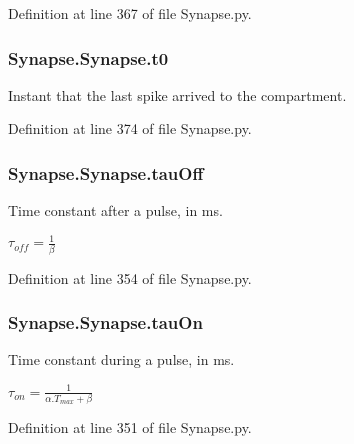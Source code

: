Definition at line 367 of file Synapse.\+py.

\subsubsection[{\texorpdfstring{t0}{t0}}]{\setlength{\rightskip}{0pt plus 5cm}Synapse.\+Synapse.\+t0}\hypertarget{class_synapse_1_1_synapse_ad0adf1cb832bd7ce7918f2779171d7d7}{}\label{class_synapse_1_1_synapse_ad0adf1cb832bd7ce7918f2779171d7d7}


Instant that the last spike arrived to the compartment. 



Definition at line 374 of file Synapse.\+py.

\subsubsection[{\texorpdfstring{tau\+Off}{tauOff}}]{\setlength{\rightskip}{0pt plus 5cm}Synapse.\+Synapse.\+tau\+Off}\hypertarget{class_synapse_1_1_synapse_afd5638a223c3fdcc672002dbced7bed0}{}\label{class_synapse_1_1_synapse_afd5638a223c3fdcc672002dbced7bed0}


Time constant after a pulse, in ms. 

$\tau_{off}=\frac{1}{\beta}$ 

Definition at line 354 of file Synapse.\+py.

\subsubsection[{\texorpdfstring{tau\+On}{tauOn}}]{\setlength{\rightskip}{0pt plus 5cm}Synapse.\+Synapse.\+tau\+On}\hypertarget{class_synapse_1_1_synapse_aae46f8edd1e94ea2ab51e3612afd3a3f}{}\label{class_synapse_1_1_synapse_aae46f8edd1e94ea2ab51e3612afd3a3f}


Time constant during a pulse, in ms. 

$\tau_{on}=\frac{1}{\alpha.T_{max} +\beta}$ 

Definition at line 351 of file Synapse.\+py.

